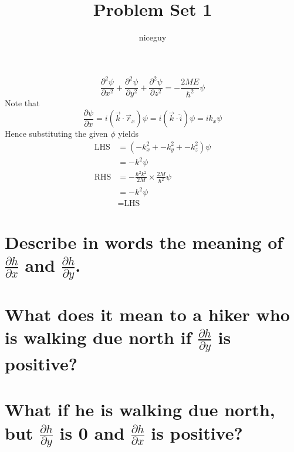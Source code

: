 \documentclass[answers]{exam}
\author{niceguy}
\title{Problem Set 1}
\begin{document}
\maketitle

\begin{questions}


\begin{solution}
	$$\frac{\partial^2\psi}{\partial x^2} + \frac{\partial^2\psi}{\partial y^2} + \frac{\partial^2\psi}{\partial z^2} = -\frac{2ME}{\hbar^2}\psi$$
	Note that
	$$\frac{\partial \psi}{\partial x} = i(\vec{k}\cdot\vec{r}_x)\psi = i(\vec{k}\cdot\hat{i})\psi = ik_x\psi$$
	Hence substituting the given $\phi$ yields
	\begin{align*}
		\text{LHS} &= (-k_x^2 + -k_y^2 + -k_z^2)\psi \\
			   &= -k^2\psi \\
		\text{RHS} &= -\frac{\hbar^2k^2}{2M}\times\frac{2M}{\hbar^2}\psi \\
			   &= -k^2\psi \\
			   &= \text{LHS}
	\end{align*}

\end{solution}


\begin{parts}
	\part{Describe in words the meaning of $\frac{\partial h}{\partial x}$ and $\frac{\partial h}{\partial y}$.}
	\part{What does it mean to a hiker who is walking due north if $\frac{\partial h}{\partial y}$ is positive?}
	\part{What if he is walking due north, but $\frac{\partial h}{\partial y}$ is 0 and $\frac{\partial h}{\partial x}$ is positive?}
\end{parts}


\end{questions}
\end{document}
